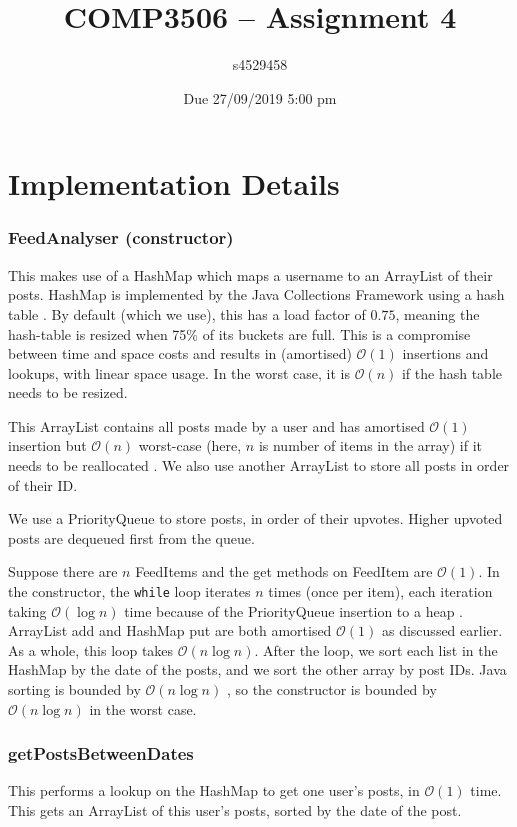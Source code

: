 \documentclass[11pt,a4paper]{article} %
\author{s4529458}
\date{{Due 27/09/2019 5:00 pm}}
\title{COMP3506 -- Assignment 4}
\begin{document}
%

\setcounter{page}{1}
\maketitle

\part*{Implementation Details}
\section*{FeedAnalyser (constructor)}
This makes use of a HashMap which maps a username to an ArrayList of their 
posts.
HashMap is implemented by the Java Collections Framework using a
hash table \cite{hashmap}. By default (which we use), this has a load factor of $0.75$,
meaning the hash-table is resized when 75\% of its buckets are full.
This is a compromise between time and space costs and results in 
(amortised) $\mathcal O(1)$ insertions and lookups, with linear space usage.
In the worst case, it is $\mathcal O(n)$ if the hash table needs to be 
resized.

This ArrayList contains all posts made by a user and has amortised $\mathcal O(1)$
insertion but $\mathcal O(n)$ worst-case (here, $n$ is number of items in the array)
if it needs to be reallocated \cite{arraylist}.
We also use another ArrayList to store all posts in order of their ID.

We use a PriorityQueue to store posts, in order of their upvotes. Higher upvoted 
posts are dequeued first from the queue. 

Suppose there are $n$ FeedItems and the get methods on FeedItem are $\mathcal O(1)$.
In the constructor, the \verb|while| loop iterates $n$ times (once per item), 
each iteration taking $\mathcal O(\log n)$ time because of the 
PriorityQueue insertion to a heap \cite{pq}. 
ArrayList add and HashMap put are both amortised $\mathcal O(1)$ 
as discussed earlier.
As a whole, this loop takes $\mathcal O(n \log n)$.
After the loop, we sort each list in the HashMap by the date of the posts, 
and we sort the other array by post IDs.
Java sorting is bounded by $\mathcal O(n \log n)$ \cite{sort},
so the constructor is bounded by
$\mathcal O(n \log n)$ in the worst case.

\section*{getPostsBetweenDates}
This performs a lookup on the HashMap to get one user's posts, 
in $\mathcal O(1)$ time. This gets an ArrayList of this user's posts, sorted 
by the date of the post.
\end{document}
